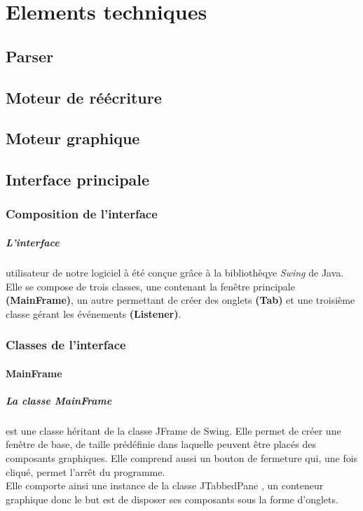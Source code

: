 \chapter{Elements techniques}
\section{Parser}\label{sec:parser}
\section{Moteur de réécriture}
\section{Moteur graphique}\label{src:interface3d}
\section{Interface principale}\label{sec:menu}
\subsection{Composition de l'interface}
\paragraph{L'interface}
 utilisateur de notre logiciel à été conçue grâce à la bibliothèqye \textit{Swing} de Java. Elle se compose de trois classes, une contenant la fenêtre principale \textbf{(MainFrame)}, un autre permettant de créer des onglets \textbf{(Tab)} et une troisième classe gérant les événements \textbf{(Listener)}.
\subsection{Classes de l'interface}
\subsubsection{MainFrame}
\paragraph{La classe MainFrame} est une classe héritant de la classe JFrame de Swing. Elle permet de créer une fenêtre de base, de taille prédéfinie dans laquelle peuvent être placés des composants graphiques. Elle comprend aussi un bouton de fermeture qui, une fois cliqué, permet l'arrêt du programme.\\
Elle comporte ainsi une instance de la classe JTabbedPane \label{jtpane}, un conteneur graphique donc le but est de disposer ses composants sous la forme d'onglets.


